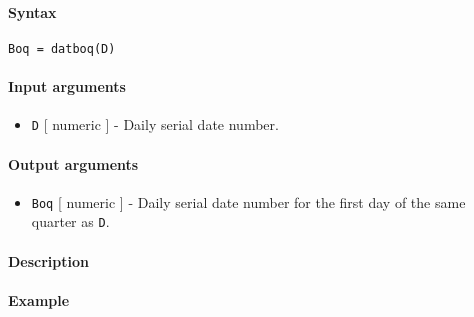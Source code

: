


	\paragraph{Syntax}\label{syntax}

\begin{verbatim}
Boq = datboq(D)
\end{verbatim}

\paragraph{Input arguments}\label{input-arguments}

\begin{itemize}
\itemsep1pt\parskip0pt
\item
  \texttt{D} {[} numeric {]} - Daily serial date number.
\end{itemize}

\paragraph{Output arguments}\label{output-arguments}

\begin{itemize}
\itemsep1pt\parskip0pt
\item
  \texttt{Boq} {[} numeric {]} - Daily serial date number for the first
  day of the same quarter as \texttt{D}.
\end{itemize}

\paragraph{Description}\label{description}

\paragraph{Example}\label{example}



